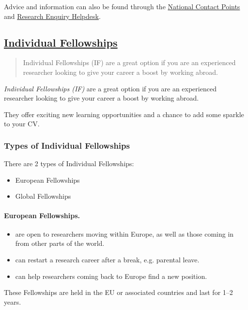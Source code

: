 \documentclass[oneside]{book}
\numberwithin{equation}{section}
\begin{document}
%
Advice and information can also be found through the \href{http://ec.europa.eu/research/participants/portal/desktop/en/support/national_contact_points.html}{National Contact Points} and \href{http://ec.europa.eu/research/index.cfm?pg=enquiries}{Research Enquiry Helpdesk}.

\subsection{\href{https://ec.europa.eu/research/mariecurieactions/actions/individual-fellowships_en}{Individual Fellowships}}
\begin{quotation}
    Individual Fellowships (IF) are a great option if you are an experienced researcher looking to give your career a boost by working abroad.
\end{quotation}
\textit{Individual Fellowships (IF)} are a great option if you are an experienced researcher looking to give your career a boost by working abroad.

They offer exciting new learning opportunities and a chance to add some sparkle to your CV.

\subsubsection{Types of Individual Fellowships}
There are 2 types of Individual Fellowships:
\begin{itemize}
    \item European Fellowships
    \item Global Fellowships
\end{itemize}

\paragraph{European Fellowships.}
\begin{itemize}
    \item are open to researchers moving within Europe, as well as those coming in from other parts of the world.
    \item can restart a research career after a break, e.g. parental leave.
    \item can help researchers coming back to Europe find a new position.
\end{itemize}
These Fellowships are held in the EU or associated countries and last for 1--2 years.
\end{document}
